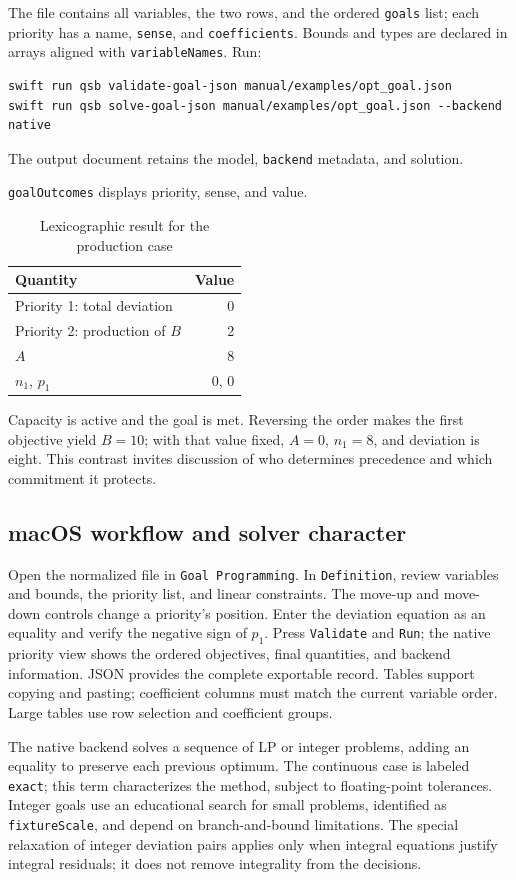 The file  contains all variables,
the two rows, and the ordered \texttt{goals} list; each priority has a name,
\texttt{sense}, and \texttt{coefficients}. Bounds and types are declared in
arrays aligned with \texttt{variableNames}. Run:
\begin{lstlisting}
swift run qsb validate-goal-json manual/examples/opt_goal.json
swift run qsb solve-goal-json manual/examples/opt_goal.json --backend native
\end{lstlisting}
The output document retains the model, \texttt{backend} metadata, and
solution.

\texttt{goalOutcomes} displays priority, sense, and value.
\begin{table}[htbp]
\centering
\caption{Lexicographic result for the production case}
\begin{tabular}{lr}
\toprule
Quantity & Value \\
\midrule
Priority 1: total deviation & 0 \\
Priority 2: production of \(B\) & 2 \\
\(A\) & 8 \\
\(n_1\), \(p_1\) & 0, 0 \\
\bottomrule
\end{tabular}
\end{table}
Capacity is active and the goal is met. Reversing the order makes the first
objective yield \(B=10\); with that value fixed, \(A=0\), \(n_1=8\), and
deviation is eight. This contrast invites discussion of who determines
precedence and which commitment it protects.

\subsection{macOS workflow and solver character}
Open the normalized file in \texttt{Goal Programming}. In
\texttt{Definition}, review variables and bounds, the priority list, and
linear constraints. The move-up and move-down controls change a priority's
position. Enter the deviation equation as an equality and verify the
negative sign of \(p_1\). Press \texttt{Validate} and \texttt{Run}; the native
priority view shows the ordered objectives, final quantities, and backend
information. JSON provides the complete exportable record. Tables support
copying and pasting; coefficient columns must match the current variable
order. Large tables use row selection and coefficient groups.

The native backend solves a sequence of LP or integer problems, adding an
equality to preserve each previous optimum. The continuous case is labeled
\texttt{exact}; this term characterizes the method, subject to floating-point
tolerances. Integer goals use an educational search for small problems,
identified as \texttt{fixtureScale}, and depend on branch-and-bound limitations.
The special relaxation of integer deviation pairs applies only when integral
equations justify integral residuals; it does not remove integrality from
the decisions.

